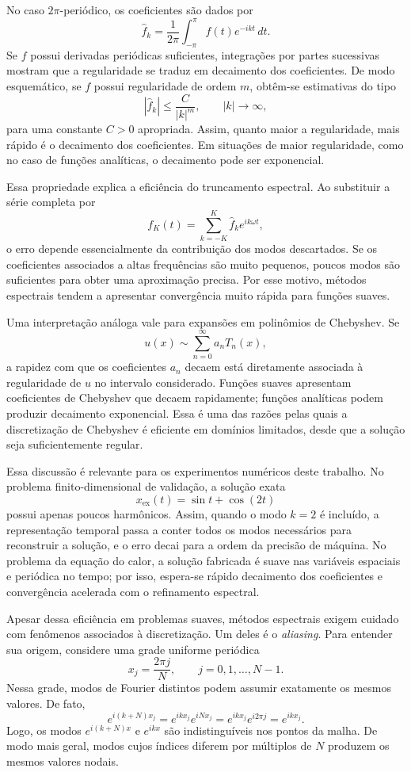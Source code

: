 No caso \(2\pi\)-periódico, os coeficientes são dados por
\[
\widehat{f}_k=
\frac{1}{2\pi}\int_{-\pi}^{\pi}f(t)e^{-ikt}\,dt.
\]
Se \(f\) possui derivadas periódicas suficientes, integrações por partes sucessivas mostram que a regularidade se traduz em decaimento dos coeficientes. De modo esquemático, se \(f\) possui regularidade de ordem \(m\), obtêm-se estimativas do tipo
\[
|\widehat{f}_k|\leq \frac{C}{|k|^m},
\qquad |k|\to\infty,
\]
para uma constante \(C>0\) apropriada. Assim, quanto maior a regularidade, mais rápido é o decaimento dos coeficientes. Em situações de maior regularidade, como no caso de funções analíticas, o decaimento pode ser exponencial.

Essa propriedade explica a eficiência do truncamento espectral. Ao substituir a série completa por
\[
f_K(t)=\sum_{k=-K}^{K}\widehat{f}_k e^{ik\omega t},
\]
o erro depende essencialmente da contribuição dos modos descartados. Se os coeficientes associados a altas frequências são muito pequenos, poucos modos são suficientes para obter uma aproximação precisa. Por esse motivo, métodos espectrais tendem a apresentar convergência muito rápida para funções suaves.

Uma interpretação análoga vale para expansões em polinômios de Chebyshev. Se
\[
u(x)\sim \sum_{n=0}^{\infty}a_nT_n(x),
\]
a rapidez com que os coeficientes \(a_n\) decaem está diretamente associada à regularidade de \(u\) no intervalo considerado. Funções suaves apresentam coeficientes de Chebyshev que decaem rapidamente; funções analíticas podem produzir decaimento exponencial. Essa é uma das razões pelas quais a discretização de Chebyshev é eficiente em domínios limitados, desde que a solução seja suficientemente regular.

Essa discussão é relevante para os experimentos numéricos deste trabalho. No problema finito-dimensional de validação, a solução exata
\[
x_{\mathrm{ex}}(t)=\sin t+\cos(2t)
\]
possui apenas poucos harmônicos. Assim, quando o modo \(k=2\) é incluído, a representação temporal passa a conter todos os modos necessários para reconstruir a solução, e o erro decai para a ordem da precisão de máquina. No problema da equação do calor, a solução fabricada é suave nas variáveis espaciais e periódica no tempo; por isso, espera-se rápido decaimento dos coeficientes e convergência acelerada com o refinamento espectral.

Apesar dessa eficiência em problemas suaves, métodos espectrais exigem cuidado com fenômenos associados à discretização. Um deles é o \emph{aliasing}. Para entender sua origem, considere uma grade uniforme periódica
\[
x_j=\frac{2\pi j}{N},
\qquad j=0,1,\dots,N-1.
\]
Nessa grade, modos de Fourier distintos podem assumir exatamente os mesmos valores. De fato,
\[
e^{i(k+N)x_j}
=
e^{ikx_j}e^{iNx_j}
=
e^{ikx_j}e^{i2\pi j}
=
e^{ikx_j}.
\]
Logo, os modos \(e^{i(k+N)x}\) e \(e^{ikx}\) são indistinguíveis nos pontos da malha. De modo mais geral, modos cujos índices diferem por múltiplos de \(N\) produzem os mesmos valores nodais.

